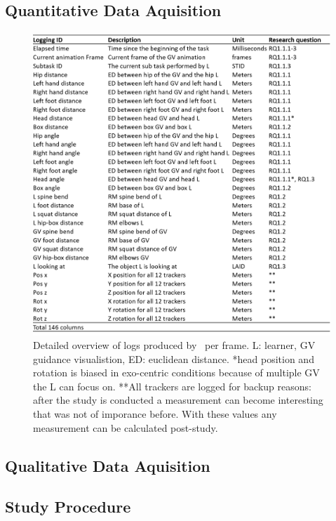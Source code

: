 \subsection{Quantitative Data Aquisition}
\label{sec:logging}
\begin{figure}[htb]
	\centering
	\includegraphics[width=\textwidth]{figures/logging_detail.png}
	\caption[logging detail]{Detailed overview of logs produced by \exgo\ per frame. L: learner, GV guidance visualistion, ED: euclidean distance. *head position and rotation is biased in exo-centric conditions because of multiple GV the L can focus on. **All trackers are logged for backup reasons: after the study is conducted a measurement can become interesting that was not of imporance before. With these values any measurement can be calculated post-study.}
	\label{fig:logging_detail}
\end{figure}

\subsection{Qualitative Data Aquisition}
\label{sec:quali_logging}

\subsection{Study Procedure}
\label{sec:procedure}

